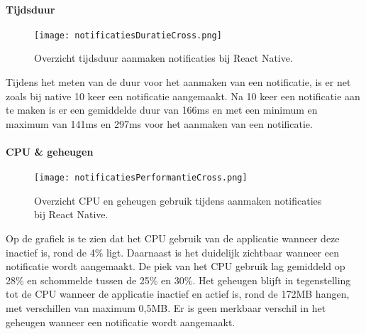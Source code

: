 \paragraph{Tijdsduur}
\begin{figure}[H]
  \centering
  \texttt{[image: notificatiesDuratieCross.png]}
  \caption{Overzicht tijdsduur aanmaken notificaties bij React Native.}
\end{figure}
Tijdens het meten van de duur voor het aanmaken van een notificatie, is er net zoals bij native 
10 keer een notificatie aangemaakt. Na 10 keer een notificatie aan te maken is er 
een gemiddelde duur van 166ms en met een minimum en 
maximum van 141ms en 297ms voor het aanmaken van een notificatie.

\paragraph{CPU \& geheugen}
\begin{figure}[H]
  \centering
  \texttt{[image: notificatiesPerformantieCross.png]}
  \caption{Overzicht CPU en geheugen gebruik tijdens aanmaken notificaties bij React Native.}
\end{figure}
Op de grafiek is te zien dat het CPU gebruik van de applicatie wanneer deze inactief is, rond de 4\% ligt. 
Daarnaast is het duidelijk zichtbaar wanneer een notificatie wordt aangemaakt. De piek van het CPU gebruik lag 
gemiddeld op 28\% en schommelde tussen de 25\% en 30\%. Het geheugen blijft in tegenstelling tot de CPU 
wanneer de applicatie inactief en actief is, rond de 172MB hangen, met verschillen van maximum 0,5MB. 
Er is geen merkbaar verschil in het geheugen wanneer een notificatie wordt aangemaakt.
